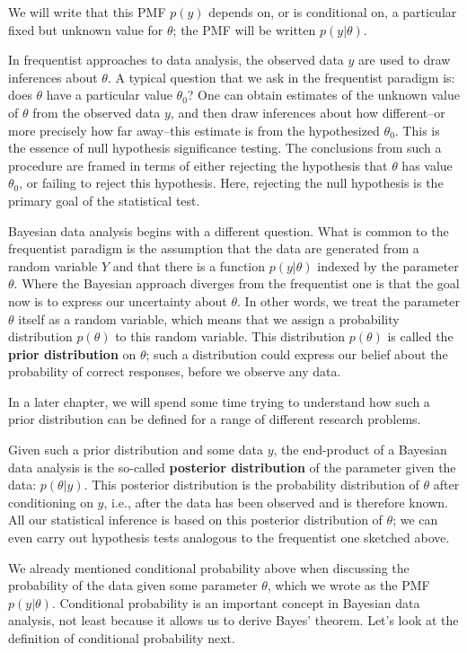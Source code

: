 \documentclass[12pt,]{krantz}
\theoremstyle{definition}
\theoremstyle{definition}
\theoremstyle{definition}
\theoremstyle{remark}
\begin{document}
We will write that this PMF \(p(y)\) depends on, or is conditional on, a
particular fixed but unknown value for \(\theta\); the PMF will be
written \(p(y|\theta)\).

In frequentist approaches to data analysis, the observed data \(y\) are
used to draw inferences about \(\theta\). A typical question that we ask
in the frequentist paradigm is: does \(\theta\) have a particular value
\(\theta_0\)? One can obtain estimates of the unknown value of
\(\theta\) from the observed data \(y\), and then draw inferences about
how different--or more precisely how far away--this estimate is from the
hypothesized \(\theta_0\). This is the essence of null hypothesis
significance testing. The conclusions from such a procedure are framed
in terms of either rejecting the hypothesis that \(\theta\) has value
\(\theta_0\), or failing to reject this hypothesis. Here, rejecting the
null hypothesis is the primary goal of the statistical test.

Bayesian data analysis begins with a different question. What is common
to the frequentist paradigm is the assumption that the data are
generated from a random variable \(Y\) and that there is a function
\(p(y|\theta)\) indexed by the parameter \(\theta\). Where the Bayesian
approach diverges from the frequentist one is that the goal now is to
express our uncertainty about \(\theta\). In other words, we treat the
parameter \(\theta\) itself as a random variable, which means that we
assign a probability distribution \(p(\theta)\) to this random variable.
This distribution \(p(\theta)\) is called the \textbf{prior
distribution} on \(\theta\); such a distribution could express our
belief about the probability of correct responses, before we observe any
data.

In a later chapter, we will spend some time trying to understand how
such a prior distribution can be defined for a range of different
research problems.

Given such a prior distribution and some data \(y\), the end-product of
a Bayesian data analysis is the so-called \textbf{posterior
distribution} of the parameter given the data: \(p(\theta | y)\). This
posterior distribution is the probability distribution of \(\theta\)
after conditioning on \(y\), i.e., after the data has been observed and
is therefore known. All our statistical inference is based on this
posterior distribution of \(\theta\); we can even carry out hypothesis
tests analogous to the frequentist one sketched above.

We already mentioned conditional probability above when discussing the
probability of the data given some parameter \(\theta\), which we wrote
as the PMF \(p(y|\theta)\). Conditional probability is an important
concept in Bayesian data analysis, not least because it allows us to
derive Bayes' theorem. Let's look at the definition of conditional
probability next.
\end{document}
